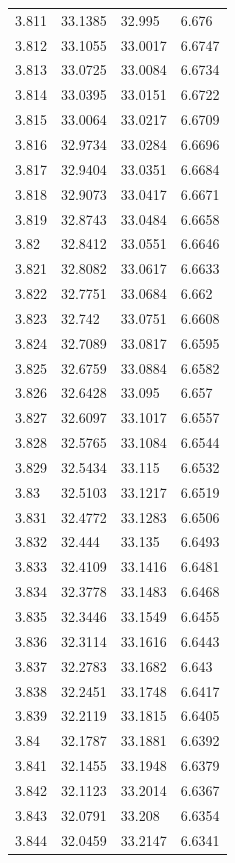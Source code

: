 \begin{tabular}{llll}
3.811 & 33.1385 & 32.995 & 6.676 \\
3.812 & 33.1055 & 33.0017 & 6.6747 \\
3.813 & 33.0725 & 33.0084 & 6.6734 \\
3.814 & 33.0395 & 33.0151 & 6.6722 \\
3.815 & 33.0064 & 33.0217 & 6.6709 \\
3.816 & 32.9734 & 33.0284 & 6.6696 \\
3.817 & 32.9404 & 33.0351 & 6.6684 \\
3.818 & 32.9073 & 33.0417 & 6.6671 \\
3.819 & 32.8743 & 33.0484 & 6.6658 \\
3.82 & 32.8412 & 33.0551 & 6.6646 \\
3.821 & 32.8082 & 33.0617 & 6.6633 \\
3.822 & 32.7751 & 33.0684 & 6.662 \\
3.823 & 32.742 & 33.0751 & 6.6608 \\
3.824 & 32.7089 & 33.0817 & 6.6595 \\
3.825 & 32.6759 & 33.0884 & 6.6582 \\
3.826 & 32.6428 & 33.095 & 6.657 \\
3.827 & 32.6097 & 33.1017 & 6.6557 \\
3.828 & 32.5765 & 33.1084 & 6.6544 \\
3.829 & 32.5434 & 33.115 & 6.6532 \\
3.83 & 32.5103 & 33.1217 & 6.6519 \\
3.831 & 32.4772 & 33.1283 & 6.6506 \\
3.832 & 32.444 & 33.135 & 6.6493 \\
3.833 & 32.4109 & 33.1416 & 6.6481 \\
3.834 & 32.3778 & 33.1483 & 6.6468 \\
3.835 & 32.3446 & 33.1549 & 6.6455 \\
3.836 & 32.3114 & 33.1616 & 6.6443 \\
3.837 & 32.2783 & 33.1682 & 6.643 \\
3.838 & 32.2451 & 33.1748 & 6.6417 \\
3.839 & 32.2119 & 33.1815 & 6.6405 \\
3.84 & 32.1787 & 33.1881 & 6.6392 \\
3.841 & 32.1455 & 33.1948 & 6.6379 \\
3.842 & 32.1123 & 33.2014 & 6.6367 \\
3.843 & 32.0791 & 33.208 & 6.6354 \\
3.844 & 32.0459 & 33.2147 & 6.6341 \\

\end{tabular}
